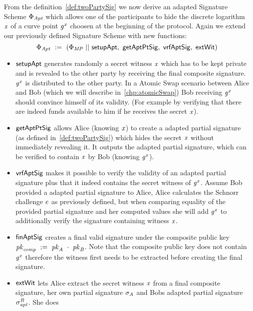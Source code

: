 \begin{definition}\label{def:twoPartyFixedWitAptSig}
    From the definition~\ref{def:twoPartySig} we now derive an adapted Signature Scheme $\Phi_{\mathit{Apt}}$ which allows one of the participants to hide the discrete logarithm $\mathit{x}$ of a curve point $\mathit{g}^{\mathit{x}}$ choosen
    at the beginning of the protocol. Again we extend our previously defined Signature Scheme with new functions:
    \[ \Phi_{\mathit{Apt}} ~:=~ (\Phi_{\mathit{MP}} ~||~ \mathsf{setupApt} ,~ \mathsf{getAptPtSig} ,~ \mathsf{vrfAptSig} ,~ \mathsf{extWit}) \]
    \begin{itemize}
        \item $\mathsf{setupApt}$ generates randomly a secret witness $\mathit{x}$ which has to be kept private and is revealed to the other party by receiving the final composite signature. $\mathit{g}^{\mathit{x}}$ is distributed
        to the other party. In a Atomic Swap scenario between Alice and Bob (which we will describe in~\ref{chp:atomicSwap}) Bob receiving $\mathit{g}^{\mathit{x}}$ should convince himself of its validity. (For example by verifying that
        there are indeed funds available to him if he receives the secret $\mathit{x}$).
        \item $\mathsf{getAptPtSig}$ allows Alice (knowing $\mathit{x}$) to create a adapted partial signature (as defined in~\ref{def:twoPartySig}) which hides the secret $\mathit{x}$ without immediately revealing it.
        It outputs the adapted partial signature, which can be verified to contain $\mathit{x}$ by Bob (knowing $\mathit{g}^{\mathit{x}}$).
        \item $\mathsf{vrfAptSig}$ makes it possible to verify the validity of an adapted partial signature plus that it indeed contains the secret witness of $\mathit{g}^{\mathit{x}}$. Assume Bob provided a adapted partial signature to Alice,
        Alice calculates the Schnorr challenge $\mathit{e}$ as previously defined, but when comparing equality of the provided partial signature and her computed values she will add $\mathit{g}^{\mathit{x}}$ to additionally
        verify the signature containing witness $\mathit{x}$.
        \item $\mathsf{finAptSig}$ creates a final valid signature under the composite public key $\mathit{pk}_{\mathit{comp}} ~:=~ \mathit{pk}_{\mathit{A}} ~\cdot~ \mathit{pk}_{\mathit{B}}$. Note that the composite public key does
        not contain $\mathit{g}^{\mathit{x}}$ therefore the witness first needs to be extracted before creating the final signature.
        \item $\mathsf{extWit}$ lets Alice extract the secret witness $\mathit{x}$ from a final composite signature, her own partial signature $\sigma_{\mathit{A}}$ and Bobs adapted partial signature $\sigma^{\mathit{B}}_{\mathit{apt}}$. She does

\end{itemize}
\end{definition}

